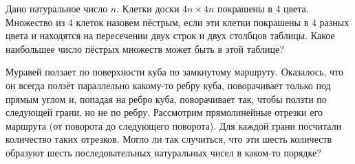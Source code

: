 \documentclass[11pt, a4paper]{problems_template}
\begin{document}
\begin{exercise}
Дано натуральное число $n$. Клетки доски $4n \times 4n$ покрашены в 4 цвета. Множество из 4 клеток назовем пёстрым, если эти клетки покрашены в 4 разных цвета и находятся на пересечении двух строк и двух столбцов таблицы. Какое наибольшее число пёстрых множеств может быть в этой таблице?
\end{exercise}

\begin{exercise}
Муравей ползает по поверхности куба по замкнутому маршруту. Оказалось,
что он всегда ползёт параллельно какому-то ребру куба, поворачивает только под прямым углом и, попадая на ребро куба, поворачивает так, чтобы ползти по следующей грани, но не по ребру. Рассмотрим прямолинейные отрезки его маршрута (от поворота до следующего поворота). Для каждой грани посчитали количество таких отрезков. Могло ли так случиться, что эти шесть количеств образуют шесть последовательных натуральных чисел в каком-то порядке?
\end{exercise}
\end{document}
